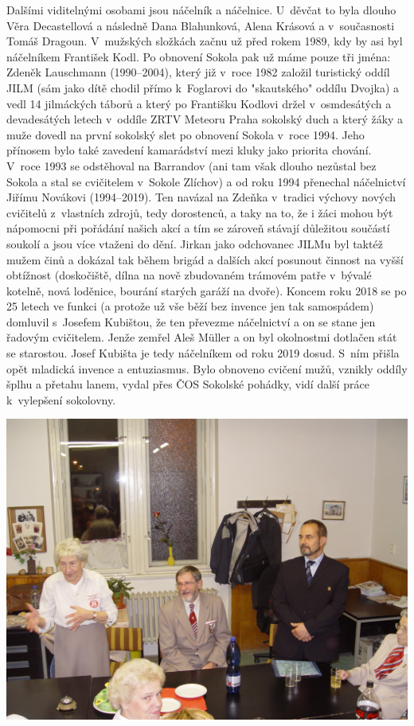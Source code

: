 \documentclass[a5paper, 11pt, twoside]{article}
\begin{document}
Dalšími viditelnými osobami jsou náčelník a náčelnice. U~děvčat to byla
dlouho Věra Decastellová a následně Dana Blahunková, Alena Krásová a
v~současnosti Tomáš Dragoun. V~mužských složkách začnu už před rokem 1989,
kdy by asi byl náčelníkem František Kodl. Po obnovení Sokola pak už máme
pouze tři jména: Zdeněk Lauschmann (1990--2004), který již v~roce 1982
založil turistický oddíl JILM (sám jako dítě chodil přímo k~Foglarovi do
"skautského" oddílu Dvojka) a vedl 14 jilmáckých táborů a který po
Františku Kodlovi držel v~osmdesátých a devadesátých letech v~oddíle
ZRTV Meteoru Praha sokolský duch a který žáky a muže dovedl na první
sokolský slet po obnovení Sokola v~roce 1994. Jeho přínosem bylo také
zavedení kamarádství mezi kluky jako priorita chování. V~roce 1993 se
odstěhoval na Barrandov (ani tam však dlouho nezůstal bez Sokola a stal
se cvičitelem v~Sokole Zlíchov) a od roku 1994 přenechal náčelnictví
Jiřímu Novákovi (1994--2019). Ten navázal na Zdeňka
v~tradici výchovy nových cvičitelů z~vlastních zdrojů, tedy dorostenců, a
taky na to, že i žáci mohou být nápomocni při pořádání našich akcí a tím
se zároveň stávají důležitou součástí soukolí a jsou více vtaženi do
dění. Jirkan jako odchovanec JILMu byl taktéž mužem činů a dokázal tak
během brigád a dalších akcí posunout činnost na vyšší obtížnost
(doskočiště, dílna na nově zbudovaném trámovém patře v~bývalé kotelně,
nová loděnice, bourání starých garáží na dvoře). Koncem roku 2018 se po
25 letech ve funkci (a protože už vše běží bez invence jen tak
samospádem) domluvil s~Josefem Kubištou, že ten převezme náčelnictví a
on se stane jen řadovým cvičitelem. Jenže zemřel Aleš Müller a on byl
okolnostmi dotlačen stát se starostou. Josef Kubišta je tedy náčelníkem
od roku 2019 dosud. S~ním přišla opět mladická invence a entuziasmus.
Bylo obnoveno cvičení mužů, vznikly oddíly šplhu a přetahu lanem, vydal
přes ČOS Sokolské pohádky, vidí další práce k~vylepšení sokolovny.

 \includegraphics[width=\textwidth]{img/49_debrifink.JPG}
\end{document}
